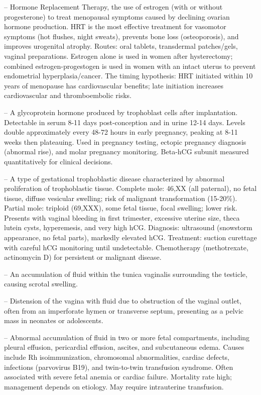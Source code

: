 -- Hormone Replacement Therapy, the use of estrogen (with or without progesterone) to treat menopausal symptoms caused by declining ovarian hormone production. HRT is the most effective treatment for vasomotor symptoms (hot flushes, night sweats), prevents bone loss (osteoporosis), and improves urogenital atrophy. Routes: oral tablets, transdermal patches/gels, vaginal preparations. Estrogen alone is used in women after hysterectomy; combined estrogen-progestogen is used in women with an intact uterus to prevent endometrial hyperplasia/cancer. The timing hypothesis: HRT initiated within 10 years of menopause has cardiovascular benefits; late initiation increases cardiovascular and thromboembolic risks.

-- A glycoprotein hormone produced by trophoblast cells after implantation. Detectable in serum 8-11 days post-conception and in urine 12-14 days. Levels double approximately every 48-72 hours in early pregnancy, peaking at 8-11 weeks then plateauing. Used in pregnancy testing, ectopic pregnancy diagnosis (abnormal rise), and molar pregnancy monitoring. Beta-hCG subunit measured quantitatively for clinical decisions.

-- A type of gestational trophoblastic disease characterized by abnormal proliferation of trophoblastic tissue. Complete mole: 46,XX (all paternal), no fetal tissue, diffuse vesicular swelling; risk of malignant transformation (15-20\%). Partial mole: triploid (69,XXX), some fetal tissue, focal swelling; lower risk. Presents with vaginal bleeding in first trimester, excessive uterine size, theca lutein cysts, hyperemesis, and very high hCG. Diagnosis: ultrasound (snowstorm appearance, no fetal parts), markedly elevated hCG. Treatment: suction curettage with careful hCG monitoring until undetectable. Chemotherapy (methotrexate, actinomycin D) for persistent or malignant disease.

-- An accumulation of fluid within the tunica vaginalis surrounding the testicle, causing scrotal swelling.

-- Distension of the vagina with fluid due to obstruction of the vaginal outlet, often from an imperforate hymen or transverse septum, presenting as a pelvic mass in neonates or adolescents.

-- Abnormal accumulation of fluid in two or more fetal compartments, including pleural effusion, pericardial effusion, ascites, and subcutaneous edema. Causes include Rh isoimmunization, chromosomal abnormalities, cardiac defects, infections (parvovirus B19), and twin-to-twin transfusion syndrome. Often associated with severe fetal anemia or cardiac failure. Mortality rate high; management depends on etiology. May require intrauterine transfusion.

